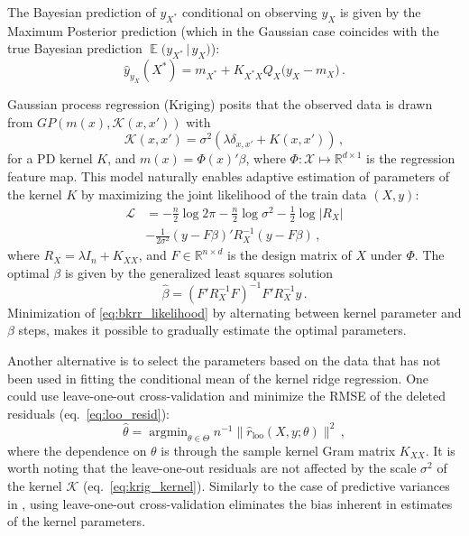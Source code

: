 \documentclass[a4paper,14pt]{extarticle}
\newcommand{\ex}{\mathop{\mathbb{E}}\nolimits}
\newcommand{\Kcal}{\mathcal{K}}
\newcommand{\Xcal}{\mathcal{X}}
\newcommand{\Real}{\mathbb{R}}
\newcommand{\Lcal}{\mathcal{L}}
\begin{document}
The Bayesian prediction of $y_{X^*}$ conditional on observing $y_X$ is given by
the Maximum Posterior prediction (which in the Gaussian case coincides with the
true Bayesian prediction $\ex\bigl(y_{X^*}\,|\, y_X\bigr)$):
\begin{equation*}
  \hat{y}_{y_X}(X^*) = m_{X^*} + K_{X^*X} Q_X \bigl(y_X - m_X\bigr) \,.
\end{equation*}

Gaussian process regression (Kriging) posits that the observed data is drawn from
$GP(m(x), \Kcal(x, x'))$ with
\begin{equation} \label{eq:krig_kernel}
  \Kcal(x,x') = \sigma^2( \lambda \delta_{x, x'} + K(x, x') ) \,,
\end{equation}
for a PD kernel $K$, and $m(x) = \Phi(x)'\beta$, where $\Phi: \Xcal\mapsto \Real^{d\times 1}$
is the regression feature map. This model naturally enables adaptive estimation of
parameters of the kernel $K$ by maximizing the joint likelihood of the train data
$(X, y)$:
\begin{align} \label{eq:bkrr_likelihood}
  \Lcal
    &= -\frac{n}{2} \log 2\pi
    - \frac{n}{2}\log \sigma^2
    - \frac{1}{2}\log \lvert R_X \rvert \nonumber\\
    &- \frac{1}{2\sigma^2} (y - F\beta)' R_X^{-1} (y - F\beta)
    \,,
\end{align}
where $R_X = \lambda I_n + K_{XX}$, and $F \in\Real^{n\times d}$ is the design matrix
of $X$ under $\Phi$. The optimal $\beta$ is given by the generalized least squares
solution
\begin{equation*}
  \hat{\beta} = (F'R_X^{-1}F)^{-1} F'R_X^{-1} y \,.
\end{equation*}
Minimization of \ref{eq:bkrr_likelihood} by alternating between kernel parameter
and $\beta$ steps, makes it possible to gradually estimate the optimal parameters.

Another alternative is to select the parameters based on the data that has not been
used in fitting the conditional mean of the kernel ridge regression. One could use
leave-one-out cross-validation and minimize the RMSE of the deleted residuals
(eq.~\ref{eq:loo_resid}):
\begin{equation}
  \hat{\theta}
    = \mathop{\text{argmin}}_{\theta \in\Theta}
      n^{-1} \| \hat{r}_{\text{loo}}(X, y; \theta) \|^2
    \,,
\end{equation}
where the dependence on $\theta$ is through the sample kernel Gram matrix $K_{XX}$.
It is worth noting that the leave-one-out residuals are not affected by the scale
$\sigma^2$ of the kernel $\Kcal$ (eq.~\ref{eq:krig_kernel}). Similarly to the case
of predictive variances in \cite{pcw20005a7}, using leave-one-out cross-validation
eliminates the bias inherent in estimates of the kernel parameters.
\end{document}
